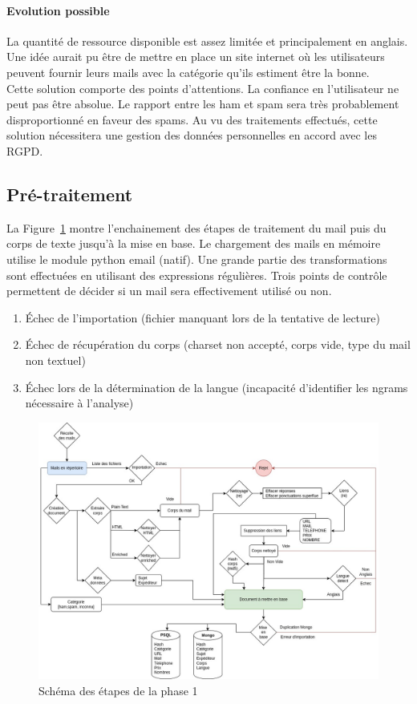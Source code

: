 	\paragraph{Evolution possible}
		La quantité de ressource disponible est assez limitée et principalement en anglais.
		Une idée aurait pu être de mettre en place un site internet où les utilisateurs peuvent fournir leurs mails avec la catégorie qu'ils estiment être la bonne. \\
		Cette solution comporte des points d'attentions.
		La confiance en l'utilisateur ne peut pas être absolue.
		Le rapport entre les ham et spam sera très probablement disproportionné en faveur des spams.
		Au vu des traitements effectués, cette solution nécessitera une gestion des données personnelles en accord avec les RGPD\@.

\subsection{Pré-traitement}
	La Figure~\ref{fig:Phase1} montre l'enchainement des étapes de traitement du mail puis du corps de texte jusqu'à la mise en base.
	Le chargement des mails en mémoire utilise le module python email (natif).
	Une grande partie des transformations sont effectuées en utilisant des expressions régulières.
	Trois points de contrôle permettent de décider si un mail sera effectivement utilisé ou non.
	\begin{enumerate}
		\item Échec de l'importation (fichier manquant lors de la tentative de lecture)
		\item Échec de récupération du corps (charset non accepté, corps vide, type du mail non textuel)
		\item Échec lors de la détermination de la langue (incapacité d'identifier les ngrams nécessaire à l'analyse)
	\end{enumerate}

	\begin{figure}[H]
		\includegraphics[width=\linewidth]{img/SchemaPhase1}
		\caption{Schéma des étapes de la phase 1}
		\label{fig:Phase1}
	\end{figure}

